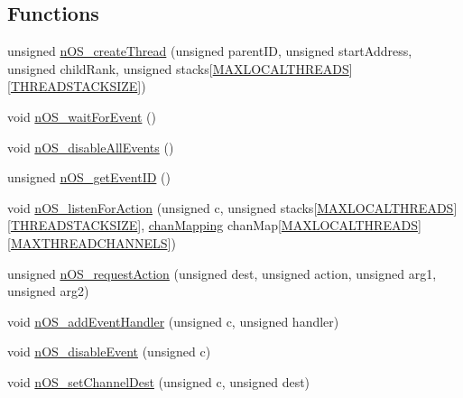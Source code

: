 \subsection*{Functions}
\begin{DoxyCompactItemize}
\item 
unsigned \hyperlink{_swallow-n_o_s__asm_8h_a139f76ebfb3fda6defea8b3bc99e4e6f}{n\+O\+S\+\_\+create\+Thread} (unsigned parent\+I\+D, unsigned start\+Address, unsigned child\+Rank, unsigned stacks\mbox{[}\hyperlink{_swallow-n_o_s__asm_8h_a8cb31be9c44f9353186d8189adc6ab61}{M\+A\+X\+L\+O\+C\+A\+L\+T\+H\+R\+E\+A\+D\+S}\mbox{]}\mbox{[}\hyperlink{_swallow-n_o_s__asm_8h_a21e454ec7311762ec0390b5c771791c1}{T\+H\+R\+E\+A\+D\+S\+T\+A\+C\+K\+S\+I\+Z\+E}\mbox{]})
\item 
void \hyperlink{_swallow-n_o_s__asm_8h_ab3669c6d80dc78762508ac069cf4ef36}{n\+O\+S\+\_\+wait\+For\+Event} ()
\item 
void \hyperlink{_swallow-n_o_s__asm_8h_a70b441ea1285fb025a8f794aaf64e0ef}{n\+O\+S\+\_\+disable\+All\+Events} ()
\item 
unsigned \hyperlink{_swallow-n_o_s__asm_8h_aef7777599d6bc742582e229a732260e1}{n\+O\+S\+\_\+get\+Event\+I\+D} ()
\item 
void \hyperlink{_swallow-n_o_s__asm_8h_af385e621eeeb8a3b7d9fef5e1f3f89bf}{n\+O\+S\+\_\+listen\+For\+Action} (unsigned c, unsigned stacks\mbox{[}\hyperlink{_swallow-n_o_s__asm_8h_a8cb31be9c44f9353186d8189adc6ab61}{M\+A\+X\+L\+O\+C\+A\+L\+T\+H\+R\+E\+A\+D\+S}\mbox{]}\mbox{[}\hyperlink{_swallow-n_o_s__asm_8h_a21e454ec7311762ec0390b5c771791c1}{T\+H\+R\+E\+A\+D\+S\+T\+A\+C\+K\+S\+I\+Z\+E}\mbox{]}, \hyperlink{structchan_mapping}{chan\+Mapping} chan\+Map\mbox{[}\hyperlink{_swallow-n_o_s__asm_8h_a8cb31be9c44f9353186d8189adc6ab61}{M\+A\+X\+L\+O\+C\+A\+L\+T\+H\+R\+E\+A\+D\+S}\mbox{]}\mbox{[}\hyperlink{_swallow-n_o_s__asm_8h_aff3d0aba3f75b128f9002ba839271db8}{M\+A\+X\+T\+H\+R\+E\+A\+D\+C\+H\+A\+N\+N\+E\+L\+S}\mbox{]})
\item 
unsigned \hyperlink{_swallow-n_o_s__asm_8h_a76acb691e510fd24ff700b7ed317fe53}{n\+O\+S\+\_\+request\+Action} (unsigned dest, unsigned action, unsigned arg1, unsigned arg2)
\item 
void \hyperlink{_swallow-n_o_s__asm_8h_acd15c5cc5466a2c88309dc4c7a5992c7}{n\+O\+S\+\_\+add\+Event\+Handler} (unsigned c, unsigned handler)
\item 
void \hyperlink{_swallow-n_o_s__asm_8h_ab72342c91961c7f560ea2ab729430dad}{n\+O\+S\+\_\+disable\+Event} (unsigned c)
\item 
void \hyperlink{_swallow-n_o_s__asm_8h_ad2b5af0b8639e739816f7dd4e85311ce}{n\+O\+S\+\_\+set\+Channel\+Dest} (unsigned c, unsigned dest)
\end{DoxyCompactItemize}


